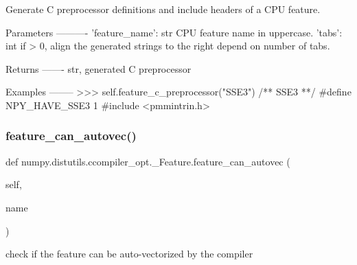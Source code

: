 \begin{DoxyVerb}Generate C preprocessor definitions and include headers of a CPU feature.

Parameters
----------
'feature_name': str
    CPU feature name in uppercase.
'tabs': int
    if > 0, align the generated strings to the right depend on number of tabs.

Returns
-------
str, generated C preprocessor

Examples
--------
>>> self.feature_c_preprocessor("SSE3")
/** SSE3 **/
#define NPY_HAVE_SSE3 1
#include <pmmintrin.h>
\end{DoxyVerb}
 \mbox{\label{classnumpy_1_1distutils_1_1ccompiler__opt_1_1__Feature_ab4e1bbbf998c1dc012f74d7cdb6bf68e}} 
\subsubsection{\texorpdfstring{feature\+\_\+can\+\_\+autovec()}{feature\_can\_autovec()}}
{\footnotesize\ttfamily def numpy.\+distutils.\+ccompiler\+\_\+opt.\+\_\+\+Feature.\+feature\+\_\+can\+\_\+autovec (\begin{DoxyParamCaption}\item[{}]{self,  }\item[{}]{name }\end{DoxyParamCaption})}

\begin{DoxyVerb}check if the feature can be auto-vectorized by the compiler
\end{DoxyVerb}
 \mbox{\label{classnumpy_1_1distutils_1_1ccompiler__opt_1_1__Feature_a99a15d5127cde74eaacc953ff19e527f}} 

